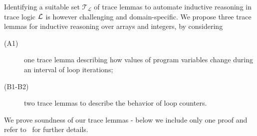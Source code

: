 Identifying a  suitable set $\mathcal{T_L}$ of trace lemmas to automate
inductive reasoning in trace logic $\mathcal{L}$ is however challenging and
domain-specific. We propose  three
trace lemmas for inductive reasoning over arrays and integers,
by considering
\begin{description}
	\item[(A1)] one trace lemma
	describing how values of program variables change during an
	interval of loop iterations;
	
	\item[(B1-B2)] two trace lemmas to describe the behavior of loop
	counters. 
\end{description}
We prove soundness of our trace lemmas - below we
include only one  proof and refer to~\cite{extendedversion} for further details.

